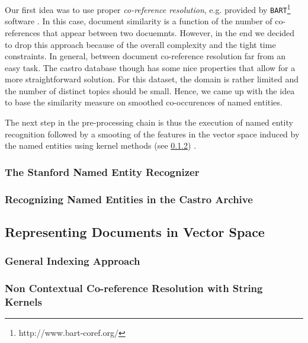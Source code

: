 Our first idea was to use proper \textit{co-reference resolution}, e.g. provided by
\texttt{BART}\footnote{http://www.bart-coref.org/} software \cite{bart}. In this case, document
similarity is a function of the number of co-references that appear between two docuemnts. However,
in the end we decided to drop this approach because of the overall complexity and the tight time
constraints. In general, between document co-reference resolution far from an easy task. The castro
database though has some nice properties that allow for a more straightforward solution. For this
dataset, the domain is rather limited and the number of distinct topics should be small. Hence, we
came up with the idea to base the similarity measure on smoothed co-occurences of named entities.

The next step in the pre-processing chain is thus the execution of named entity recognition followed
by a smooting of the features in the vector space induced by the named entities using kernel
methods (see \ref{sec:string_kernel}) \cite{string_kernel_coref}.

\subsubsection{The Stanford Named Entity Recognizer}
\label{sec:stanford_named_entity_recognizer}

\subsubsection{Recognizing Named Entities in the Castro Archive}
\label{sec:recognizing_named_enitiies_in_the_castro_archive}

\subsection {Representing Documents in Vector Space}
\label{sec:representing_documents_in_vector_space}

\subsubsection{General Indexing Approach}
\label{sec:general_indexing_approach}

\subsubsection {Non Contextual Co-reference Resolution with String Kernels}
\label{sec:string_kernel}

